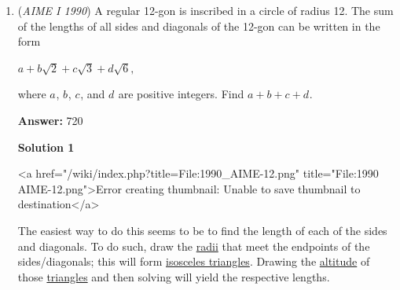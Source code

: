 \begin{enumerate}
 For ex. largest $n$ such that product of $n-6$ consecutive positive integers is equal to $n!$ is $7!-1 = 5039$

 Proof:Reasoning the same way as above, let the largest of the $n-a$ consecutive positive integers be $k$. Clearly $k$ cannot be less than or equal to $n$, else the product of $n-a$ consecutive positive integers will be less than $n!$.

 Now, observe that for $n$ to be maximum the smallest number (or starting number) of the $n-a$ consecutive positive integers must be minimum, implying that $k$ needs to be minimum. But the least $k > n$ is $n+1$.

 So the $n-a$ consecutive positive integers are $a+2, a+3, \ldots n+1$

 So we have $\frac{(n+1)!}{(a+1)!} = n!$$\Longrightarrow  n+1 = (a+1)!$$\Longrightarrow  n = (a+1)! -1$
$Kris17$



	\item (\textit{AIME I 1990}) A regular 12-gon is inscribed in a circle of radius 12.  The sum of the lengths of all sides and diagonals of the 12-gon can be written in the form


 $a + b \sqrt{2} + c \sqrt{3} + d \sqrt{6},$

 where $a^{}_{}$, $b^{}_{}$, $c^{}_{}$, and $d^{}_{}$ are positive integers.  Find $a + b + c + d^{}_{}$.


 
 \textbf{Answer: }720



\textbf{Solution 1}

<a href="/wiki/index.php?title=File:1990\_AIME-12.png" title="File:1990 AIME-12.png">Error creating thumbnail: Unable to save thumbnail to destination</a>

 The easiest way to do this seems to be to find the length of each of the sides and diagonals. To do such, draw the \href{https://artofproblemsolving.com/wiki/index.php?title=Radius}{radii} that meet the endpoints of the sides/diagonals; this will form \href{https://artofproblemsolving.com/wiki/index.php?title=Isosceles\_triangle}{isosceles triangles}. Drawing the \href{https://artofproblemsolving.com/wiki/index.php?title=Altitude}{altitude} of those \href{https://artofproblemsolving.com/wiki/index.php?title=Triangle}{triangles} and then solving will yield the respective lengths.


\end{enumerate}
